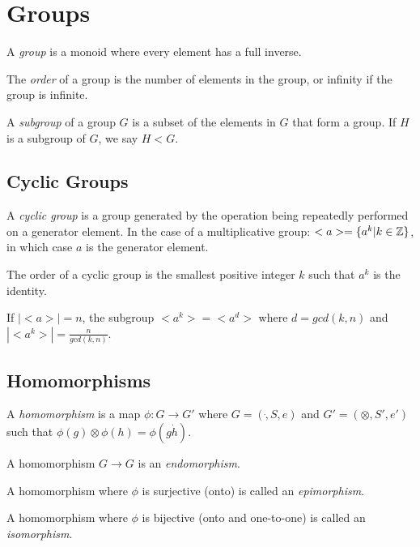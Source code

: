 \chapter{Groups}

A \emph{group} is a monoid where every element has a full inverse.

The \emph{order} of a group is the number of elements in the group, or
infinity if the group is infinite.

A \emph{subgroup} of a group $G$ is a subset of the elements in $G$
that form a group.  If $H$ is a subgroup of $G$, we say $H < G$.

\section{Cyclic Groups}

A \emph{cyclic group} is a group generated by the operation being
repeatedly performed on a generator element.  In the case of a
multiplicative group: $<a> = \{ a^k | k \in \mathbb{Z} \}$, in which case $a$
is the generator element.

The order of a cyclic group is the smallest positive integer $k$ such
that $a^k$ is the identity.

If $|<a>| = n$, the subgroup $<a^k> = <a^d>$ where $d = gcd(k,n)$ and
$|<a^k>| = \frac{n}{gcd(k,n)}$.

\section{Homomorphisms}

A \emph{homomorphism} is a map $\phi : G \rightarrow G'$ where $G =
(\dot,S,e)$ and $G' = (\otimes,S',e')$ such that $\phi(g) \otimes
\phi(h) = \phi(g \dot h)$.

A homomorphism $G \rightarrow G$ is an \emph{endomorphism}.

A homomorphism where $\phi$ is surjective (onto) is called an
\emph{epimorphism}.

A homomorphism where $\phi$ is bijective (onto and one-to-one) is
called an \emph{isomorphism}.
